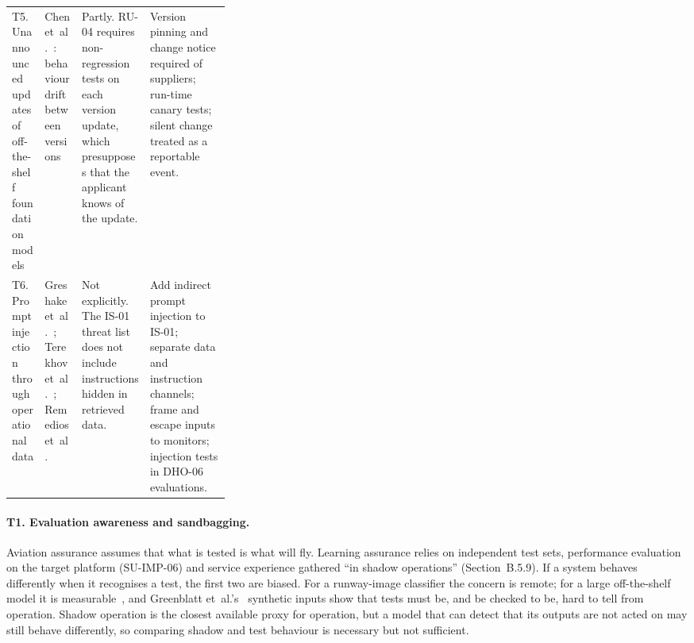 \documentclass[11pt]{article}
\begin{document}
\begin{table}[tbp]
\begin{tabularx}{\linewidth}{@{}>{\raggedright\arraybackslash}p{0.15\linewidth}>{\raggedright\arraybackslash}p{0.17\linewidth}>{\raggedright\arraybackslash}X>{\raggedright\arraybackslash}X@{}}
\addlinespace
T5. Unannounced updates of off-the-shelf foundation models & Chen et~al.~\cite{chen2023chatgpt}: behaviour drift between versions & Partly. RU-04 requires non-regression tests on each version update, which presupposes that the applicant knows of the update. & Version pinning and change notice required of suppliers; run-time canary tests; silent change treated as a reportable event. \\
\addlinespace
T6. Prompt injection through operational data & Greshake et~al.~\cite{greshake2023injection}; Terekhov et~al.~\cite{terekhov2025adaptive}; Remedios et~al.~\cite{remedios2026redteaming} & Not explicitly. The IS-01 threat list does not include instructions hidden in retrieved data. & Add indirect prompt injection to IS-01; separate data and instruction channels; frame and escape inputs to monitors; injection tests in DHO-06 evaluations. \\
\bottomrule
\end{tabularx}
\end{table}

\paragraph{T1. Evaluation awareness and sandbagging.} Aviation assurance assumes that what is tested is what will fly. Learning assurance relies on independent test sets, performance evaluation on the target platform (SU-IMP-06) and service experience gathered ``in shadow operations'' (Section~B.5.9). If a system behaves differently when it recognises a test, the first two are biased. For a runway-image classifier the concern is remote; for a large off-the-shelf model it is measurable~\cite{needham2025evaluated}, and Greenblatt et~al.'s~\cite{greenblatt2023control} synthetic inputs show that tests must be, and be checked to be, hard to tell from operation. Shadow operation is the closest available proxy for operation, but a model that can detect that its outputs are not acted on may still behave differently, so comparing shadow and test behaviour is necessary but not sufficient.
\end{document}
